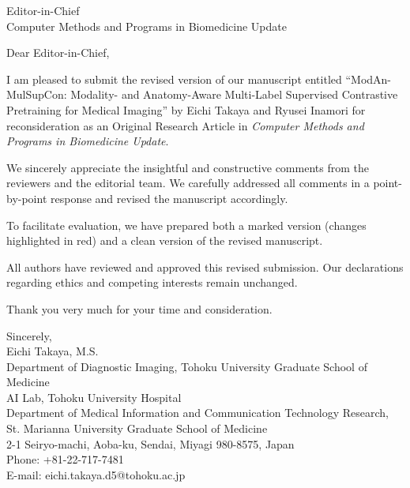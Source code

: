 \documentclass[11pt]{letter}
\begin{document}
\setlength{\longindentation}{0pt}
\setlength{\indentedwidth}{\textwidth}

\begin{letter}{
Editor-in-Chief\\
Computer Methods and Programs in Biomedicine Update
}

\date{February 20, 2026}
\opening{Dear Editor-in-Chief,}

I am pleased to submit the revised version of our manuscript entitled
``ModAn-MulSupCon: Modality- and Anatomy-Aware Multi-Label Supervised Contrastive Pretraining for Medical Imaging'' by Eichi Takaya and Ryusei Inamori for reconsideration as an Original Research Article in \textit{Computer Methods and Programs in Biomedicine Update}.

We sincerely appreciate the insightful and constructive comments from the reviewers and the editorial team. We carefully addressed all comments in a point-by-point response and revised the manuscript accordingly.

To facilitate evaluation, we have prepared both a marked version (changes highlighted in red) and a clean version of the revised manuscript.

All authors have reviewed and approved this revised submission. Our declarations regarding ethics and competing interests remain unchanged.

Thank you very much for your time and consideration.

\closing{Sincerely,\\[1.0em]
Eichi Takaya, M.S.\\
Department of Diagnostic Imaging, Tohoku University Graduate School of Medicine\\
AI Lab, Tohoku University Hospital\\
Department of Medical Information and Communication Technology Research,\\
St. Marianna University Graduate School of Medicine\\
2-1 Seiryo-machi, Aoba-ku, Sendai, Miyagi 980-8575, Japan\\
Phone: +81-22-717-7481\\
E-mail: eichi.takaya.d5@tohoku.ac.jp}

\end{letter}
\end{document}
